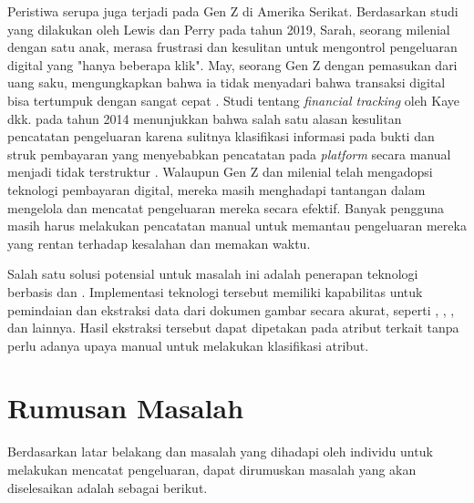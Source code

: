 Peristiwa serupa juga terjadi pada Gen Z di Amerika Serikat. Berdasarkan studi yang dilakukan oleh Lewis dan Perry pada tahun 2019, Sarah, seorang milenial dengan satu anak, merasa frustrasi dan kesulitan untuk mengontrol pengeluaran digital yang "hanya beberapa klik". May, seorang Gen Z dengan pemasukan dari uang saku, mengungkapkan bahwa ia tidak menyadari bahwa transaksi digital bisa tertumpuk dengan sangat cepat \parencite{lewis2019follow}. Studi tentang \emph{financial tracking} oleh Kaye dkk. pada tahun 2014 menunjukkan bahwa salah satu alasan kesulitan pencatatan pengeluaran karena sulitnya klasifikasi informasi pada bukti dan struk pembayaran yang menyebabkan pencatatan pada \emph{platform} secara manual menjadi tidak terstruktur \parencite{kaye2014money}. Walaupun Gen Z dan milenial telah mengadopsi teknologi pembayaran digital, mereka masih menghadapi tantangan dalam mengelola dan mencatat pengeluaran mereka secara efektif. Banyak pengguna masih harus melakukan pencatatan manual untuk memantau pengeluaran mereka yang rentan terhadap kesalahan dan memakan waktu.


Salah satu solusi potensial untuk masalah ini adalah penerapan teknologi berbasis \cvfull{} dan \dl{}. Implementasi teknologi tersebut memiliki kapabilitas untuk pemindaian dan ekstraksi data dari dokumen gambar secara akurat, seperti \ocrfull, \cnnfull, \transformer, dan lainnya. Hasil ekstraksi tersebut dapat dipetakan pada atribut terkait tanpa perlu adanya upaya manual untuk melakukan klasifikasi atribut.


\section{Rumusan Masalah}
\label{sec:rumusanmasalah}

Berdasarkan latar belakang dan masalah yang dihadapi oleh individu untuk melakukan mencatat pengeluaran, dapat dirumuskan masalah yang akan diselesaikan adalah sebagai berikut.

